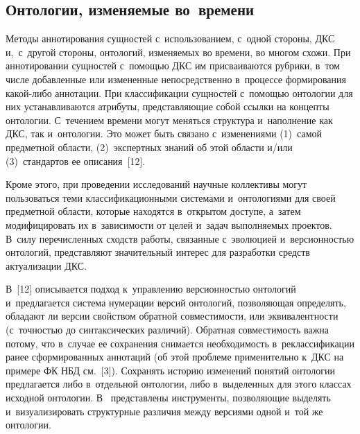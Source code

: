 \begin{multicols}{2}
\section{Онтологии, изменяемые во~времени}

\vspace*{-4pt}

Методы аннотирования сущностей с~использованием, с~одной стороны, ДКС 
и,~с~другой стороны, онтологий, изменяемых во времени, во многом схожи. 
При аннотировании сущностей \mbox{с~по\-мощью} ДКС им присваиваются рубрики, в~том числе 
до\-бав\-лен\-ные или измененные непосредственно в~процессе 
формирования ка\-кой-ли\-бо аннотации. При классификации сущностей 
с~по\-мощью онтологии для них устанавливаются атрибуты, пред\-став\-ля\-ющие 
собой ссылки на концепты онтологии. С~течением времени могут меняться 
структура и~наполнение как ДКС, так и~онтологии. Это может быть связано 
с~изменениями (1)~самой предметной об\-ласти, (2)~экспертных знаний об этой 
области и/или (3)~стандартов ее описания~[12].

Кроме этого, при проведении исследований научные коллективы могут 
пользоваться теми классификационными системами и~онтологиями для \mbox{своей} 
предметной области, которые находятся в~откры\-том доступе, а~затем 
модифицировать их в~зависимости от целей и~задач выполняемых проектов. 
В~силу перечисленных сходств работы, связанные с~эволюцией 
и~версионностью онтологий, представляют значительный интерес для 
разработки средств актуализации ДКС.

В~[12] описывается подход к~управлению версионностью онтологий 
и~предлагается система нумерации версий онтологий, позволяющая 
определять, обладают ли версии свойством обратной \mbox{совместимости}, или 
эквивалентности (с~точ\-ностью до синтаксических различий). Обратная 
совместимость важна потому, что в~случае ее сохранения снимается 
необходимость в~реклассификации ранее сформированных аннотаций (об 
этой проблеме применительно к~ДКС на примере ФК НБД см.~[3]). 
Сохранять историю изменений понятий онтологии предлагается либо 
в~отдельной онтологии, либо в~выделенных для этого классах исходной 
онтологии. В~\cite{13-gon} представлены инструменты, позволяющие 
выделять и~визуализировать структурные различия между версиями одной 
и~той же онтологии.


\end{multicols}
